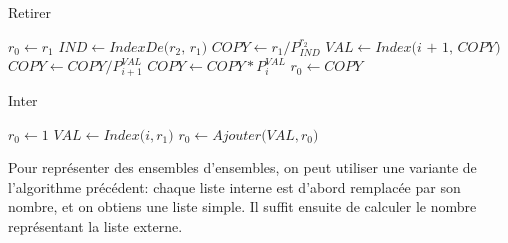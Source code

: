 \documentclass{article}
\begin{document}
    \begin{algorithm}[H]
        \caption{Retirer}\label{Retirer}
        \begin{algorithmic}
        \State $\textit{$r_0$} \gets \text{$r_1$}$
        \State $\textit{$IND$} \gets \textit{IndexDe($r_2$, $r_1$)}$
            \State $\textit{$COPY$} \gets \textit{$r_1$} / P_{IND}^{r_2}$ 
             
                \State $\textit{$VAL$} \gets \textit{Index(i + 1, COPY)}$
                \State $\textit{$COPY$} \gets \textit{$COPY$} / P_{i + 1}^{VAL}$
                \State $\textit{$COPY$} \gets \textit{$COPY$} * P_{i}^{VAL}$
            \EndFor
            \State $\textit{$r_0$} \gets COPY$
        \EndIf
        \EndProcedure
        \end{algorithmic}
    \end{algorithm}

    \begin{algorithm}[H]
        \caption{Inter}\label{Inter}
        \begin{algorithmic}
        \State $\textit{$r_0$} \gets \text{1}$
            \State $\textit{$VAL$} \gets \textit{Index($i, r_1$)}$
             
                \State $\textit{$r_0$} \gets \textit{Ajouter($VAL, r_0$)}$
            \EndIf
        \EndFor
        \EndProcedure
        \end{algorithmic}
    \end{algorithm}

    Pour représenter des ensembles d'ensembles, on peut utiliser une variante de l'algorithme précédent:
    chaque liste interne est d'abord remplacée par son nombre, et on obtiens une liste simple.
    Il suffit ensuite de calculer le nombre représentant la liste externe.
\end{document}
